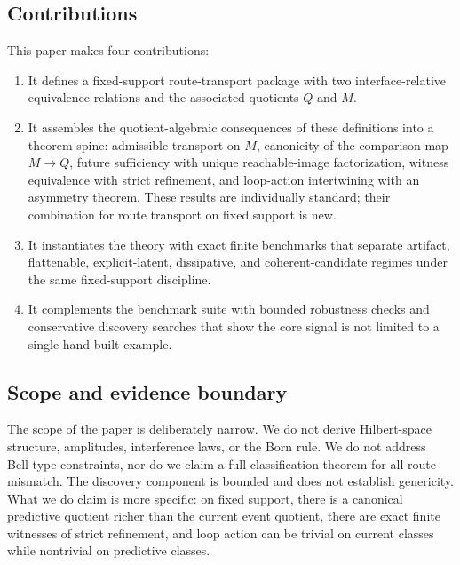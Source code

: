\documentclass[11pt]{article}
\newcommand{\CurrentQ}{Q}
\newcommand{\PredictiveQ}{M}
\theoremstyle{definition}
\begin{document}
\subsection{Contributions}\label{subsec:intro-contributions}
This paper makes four contributions:
\begin{enumerate}
\item It defines a fixed-support route-transport package with two interface-relative equivalence relations and the associated quotients $\CurrentQ$ and $\PredictiveQ$.
\item It assembles the quotient-algebraic consequences of these definitions into a theorem spine: admissible transport on $\PredictiveQ$, canonicity of the comparison map $\PredictiveQ \to \CurrentQ$, future sufficiency with unique reachable-image factorization, witness equivalence with strict refinement, and loop-action intertwining with an asymmetry theorem. These results are individually standard; their combination for route transport on fixed support is new.
\item It instantiates the theory with exact finite benchmarks that separate artifact, flattenable, explicit-latent, dissipative, and coherent-candidate regimes under the same fixed-support discipline.
\item It complements the benchmark suite with bounded robustness checks and conservative discovery searches that show the core signal is not limited to a single hand-built example.
\end{enumerate}

\subsection{Scope and evidence boundary}\label{subsec:intro-scope}
The scope of the paper is deliberately narrow. We do not derive Hilbert-space structure, amplitudes, interference laws, or the Born rule. We do not address Bell-type constraints, nor do we claim a full classification theorem for all route mismatch. The discovery component is bounded and does not establish genericity. What we do claim is more specific: on fixed support, there is a canonical predictive quotient richer than the current event quotient, there are exact finite witnesses of strict refinement, and loop action can be trivial on current classes while nontrivial on predictive classes.
\end{document}
